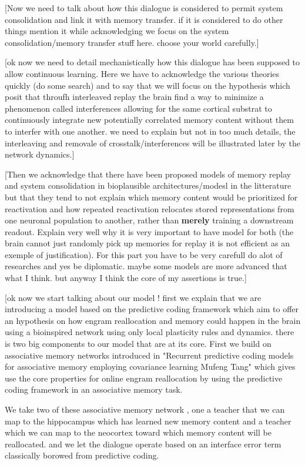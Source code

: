 \documentclass[10pt,letterpaper]{article}
\theoremstyle{plain}
\theoremstyle{remark}
\begin{document}
[Now we need to talk about how this dialogue is considered to permit system consolidation and link it with memory transfer. if it is considered to do other things mention it while acknowledging we focus on the system consolidation/memory transfer stuff here. choose your world carefully.]

[ok now we need to detail mechanistically how this dialogue has been supposed to allow continuous learning. Here we have to acknowledge the various theories quickly (do some search) and to say that we will focus on the hypothesis which posit that throufh interleaved replay the brain find a way to minimize a phenomenon called interferences allowing for the same cortical substrat to continuously integrate new potentially correlated memory content without them to interfer with one another. we need to explain but not in too much details, the interleaving and removale of crosstalk/interferences will be illustrated later by the network dynamics.]

[Then we acknowledge that there have been proposed models of memory replay and system consolidation in bioplausible architectures/modesl in the litterature but that they tend to not explain which memory content would be prioritized for reactivation and how repeated reactivation relocates stored representations from one neuronal population to another, rather than \textbf{merely} training a downstream readout. Explain very well why it is very important to have model for both (the brain cannot just randomly pick up memories for replay it is not efficient as an exemple of justification). For this part you have to be very carefull do alot of researches and yes be diplomatic. maybe some models are more advanced that what I think. but anyway I think the core of my assertions is true.]

[ok now we start talking about our model ! first we explain that we are introducing a model based on the predictive coding framework which aim to offer an hypothesis on how engram reallocation and memory could happen in the brain using a bioinspired network using only local plasticity rules and dynamics.  
there is two big components to our model that are at its core. First we build on associative memory networks introduced in "Recurrent predictive coding models for associative memory employing covariance learning Mufeng Tang" which gives use the core properties for online engram reallocation by using the predictive coding framework in an associative memory task. 

We take two of these associative memory network , one a teacher that we can map to the hippocampus which has learned new memory content and a teacher which we can map to the neocortex toward which memory content will be reallocated. and we let the dialogue operate based on an interface error term classically borowed from predictive coding.
\end{document}
